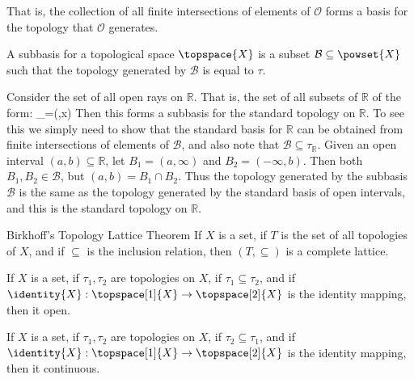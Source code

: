 \documentclass{book}                                                           %
\begin{document}
            That is, the collection of all finite intersections of elements of
            $\mathcal{O}$ forms a basis for the topology that $\mathcal{O}$
            generates.
            \begin{definition}
                A subbasis for a topological space $\topspace{X}$ is a subset
                $\mathcal{B}\subseteq\powset{X}$ such that the topology generated
                by $\mathcal{B}$ is equal to $\tau$.
            \end{definition}
            \begin{example}
                Consider the set of all open rays on $\mathbb{R}$. That is, the set
                of all subsets of $\mathbb{R}$ of the form:
                            {_{\minus}=(\minus\infty,x)}
                Then this forms a subbasis for the standard topology on
                $\mathbb{R}$. To see this we simply need to show that the standard
                basis for $\mathbb{R}$ can be obtained from finite intersections of
                elements of $\mathcal{B}$, and also note that
                $\mathcal{B}\subseteq\tau_{\mathbb{R}}$. Given an open interval
                $(a,b)\subseteq\mathbb{R}$, let $B_{1}=(a,\infty)$ and
                $B_{2}=(\minus\infty,b)$. Then both $B_{1},B_{2}\in\mathcal{B}$,
                but $(a,b)=B_{1}\cap{B}_{2}$. Thus the topology generated by the
                subbasis $\mathcal{B}$ is the same as the topology generated by the
                standard basis of open intervals, and this is the standard
                topology on $\mathbb{R}$.
            \end{example}
            \begin{ltheorem}{Birkhoff's Topology Lattice Theorem}
                If $X$ is a set, if $T$ is the set of all topologies of $X$, and if
                $\subseteq$ is the inclusion relation, then $(T,\subseteq)$ is a
                complete lattice.
            \end{ltheorem}
            \begin{theorem}
                If $X$ is a set, if $\tau_{1},\tau_{2}$ are topologies on $X$,
                if $\tau_{1}\subseteq\tau_{2}$, and if
                $\identity{X}:\topspace[1]{X}\rightarrow\topspace[2]{X}$ is the
                identity mapping, then it open.
            \end{theorem}
            \begin{theorem}
                If $X$ is a set, if $\tau_{1},\tau_{2}$ are topologies on $X$,
                if $\tau_{2}\subseteq\tau_{1}$, and if
                $\identity{X}:\topspace[1]{X}\rightarrow\topspace[2]{X}$ is the
                identity mapping, then it continuous.
            \end{theorem}
\end{document}
